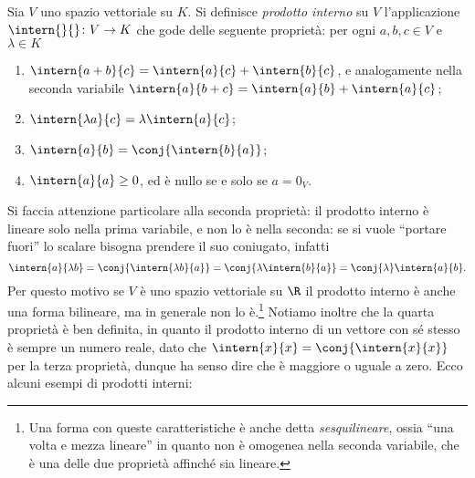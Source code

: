 \begin{definizione} \label{d:prodotto-interno}
	Sia $V$ uno spazio vettoriale su $K$.
	Si definisce \emph{prodotto interno} su $V$ l'applicazione $\intern{}{}\colon V\to K$ che gode delle seguente proprietà: per ogni $  a,  b,  c\in V$ e $\lambda\in K$
	\begin{enumerate}
		\item $\intern{  a+  b}{  c}=\intern{  a}{  c}+\intern{  b}{  c}$, e analogamente nella seconda variabile $\intern{  a}{  b+  c}=\intern{  a}{  b}+\intern{  a}{  c}$;
		\item $\intern{\lambda  a}{  c}=\lambda\intern{  a}{  c}$;
		\item $\intern{  a}{  b}=\conj{\intern{  b}{  a}}$;
		\item $\intern{  a}{  a}\geq 0$, ed è nullo se e solo se $  a=0_V$.
	\end{enumerate}
\end{definizione}
Si faccia attenzione particolare alla seconda proprietà: il prodotto interno è lineare solo nella prima variabile, e non lo è nella seconda: se si vuole ``portare fuori'' lo scalare bisogna prendere il suo coniugato, infatti
\begin{equation*}
	\intern{  a}{\lambda  b}=\conj{\intern{\lambda  b}{  a}}=\conj{\lambda\intern{  b}{  a}}=\conj{\lambda}\intern{  a}{  b}.
\end{equation*}
Per questo motivo se $V$ è uno spazio vettoriale su $\R$ il prodotto interno è anche una forma bilineare, ma in generale non lo è.\footnote{Una forma con queste caratteristiche è anche detta \emph{sesquilineare}, ossia ``una volta e mezza lineare'' in quanto non è omogenea nella seconda variabile, che è una delle due proprietà affinch\'e sia lineare.}
Notiamo inoltre che la quarta proprietà è ben definita, in quanto il prodotto interno di un vettore con sé stesso è sempre un numero reale, dato che $\intern{  x}{  x}=\conj{\intern{  x}{  x}}$ per la terza proprietà, dunque ha senso dire che è maggiore o uguale a zero.
Ecco alcuni esempi di prodotti interni:
